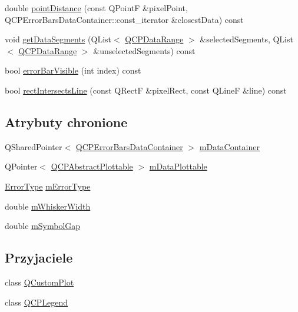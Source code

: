 \begin{DoxyCompactItemize}
\item 
double \hyperlink{class_q_c_p_error_bars_a6701c510c6a0ad95d3335c6f2470eca0}{point\+Distance} (const Q\+PointF \&pixel\+Point, Q\+C\+P\+Error\+Bars\+Data\+Container\+::const\+\_\+iterator \&closest\+Data) const 
\item 
void \hyperlink{class_q_c_p_error_bars_a1e9fef8dd1853558c05d1235c1a1b033}{get\+Data\+Segments} (Q\+List$<$ \hyperlink{class_q_c_p_data_range}{Q\+C\+P\+Data\+Range} $>$ \&selected\+Segments, Q\+List$<$ \hyperlink{class_q_c_p_data_range}{Q\+C\+P\+Data\+Range} $>$ \&unselected\+Segments) const 
\item 
bool \hyperlink{class_q_c_p_error_bars_ae654c5016cebd994b104684578358afe}{error\+Bar\+Visible} (int index) const 
\item 
bool \hyperlink{class_q_c_p_error_bars_a4c2f5cf2afe52b702c07c977758b29dd}{rect\+Intersects\+Line} (const Q\+RectF \&pixel\+Rect, const Q\+LineF \&line) const 
\end{DoxyCompactItemize}
\subsection*{Atrybuty chronione}
\begin{DoxyCompactItemize}
\item 
Q\+Shared\+Pointer$<$ \hyperlink{qcustomplot_8hh_a8c4472a4da738e0ddbf6b03222c39906}{Q\+C\+P\+Error\+Bars\+Data\+Container} $>$ \hyperlink{class_q_c_p_error_bars_a83c7f452d0eebd302a7e4fb3a1957634}{m\+Data\+Container}
\item 
Q\+Pointer$<$ \hyperlink{class_q_c_p_abstract_plottable}{Q\+C\+P\+Abstract\+Plottable} $>$ \hyperlink{class_q_c_p_error_bars_a14b6a5b49295990da84a05a3a89026bb}{m\+Data\+Plottable}
\item 
\hyperlink{class_q_c_p_error_bars_a95f0220f11a72648b96480a85ce26474}{Error\+Type} \hyperlink{class_q_c_p_error_bars_af9fd3117b86aac728c9e8e87c406ed9a}{m\+Error\+Type}
\item 
double \hyperlink{class_q_c_p_error_bars_a3873724f7ac3392bdf9d46a47076a1d2}{m\+Whisker\+Width}
\item 
double \hyperlink{class_q_c_p_error_bars_a5cb5628b75e5aff0875710705666ec57}{m\+Symbol\+Gap}
\end{DoxyCompactItemize}
\subsection*{Przyjaciele}
\begin{DoxyCompactItemize}
\item 
class \hyperlink{class_q_c_p_error_bars_a1cdf9df76adcfae45261690aa0ca2198}{Q\+Custom\+Plot}
\item 
class \hyperlink{class_q_c_p_error_bars_a8429035e7adfbd7f05805a6530ad5e3b}{Q\+C\+P\+Legend}
\end{DoxyCompactItemize}
